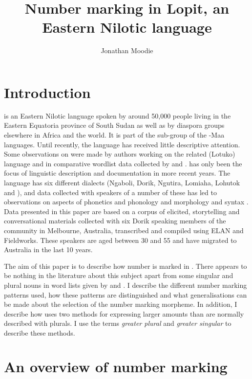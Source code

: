 \documentclass[output=paper]{langsci/langscibook}
\title{Number marking in Lopit, an Eastern Nilotic language}
\author{%
Jonathan Moodie \affiliation{University of Melbourne}
}
\begin{document}
\section{Introduction} \label{sec:moodie:1}

 is an Eastern Nilotic language spoken by around 50,000 people living in the Eastern Equatoria province of South Sudan as well as by diaspora groups elsewhere in Africa and the world. It is part of the  sub-group of the -Maa languages. Until recently, the  language has received little descriptive attention. Some observations on  were made by authors working on the related  (Lotuko) language \citep{Muratori1938} and in comparative wordlist data collected by \citet{Driberg1932} and \citet{Vossen1982}.  has only been the focus of linguistic description and documentation in more recent years. The language has six different dialects (Ngaboli, Dorik, Ngutira, Lomiaha, Lohutok and ), and data collected with speakers of a number of these has led to observations on aspects of  phonetics and phonology \citep{Turner2001,Stirtz2014,Billington2014} and morphology and syntax \citep[e.g.][]{Laduetal2014}. Data presented in this paper are based on a corpus of elicited, storytelling and conversational materials collected with six Dorik speaking members of the  community in Melbourne, Australia, transcribed and compiled using ELAN and Fieldworks. These speakers are aged between 30 and 55 and have migrated to Australia in the last 10 years.

The aim of this paper is to describe how number is marked in . There appears to be nothing in the literature about this subject apart from some singular and plural nouns in word lists given by \citet{Driberg1932} and \citet{Vossen1982}. I describe the different number marking patterns used, how these patterns are distinguished and what generalisations can be made about the selection of the number marking morpheme. In addition, I describe how  uses two methods for expressing larger amounts than are normally described with plurals. I use the terms \textit{greater plural} and \textit{greater singular} to describe these methods. 

\section{An overview of number marking}\label{sec:moodie:2}
\end{document}

